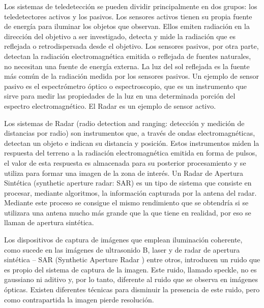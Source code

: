 Los sistemas de teledetección se pueden dividir principalmente en dos grupos: los teledetectores activos y los pasivos. Los sensores activos tienen su propia fuente de energía para iluminar los objetos que observan. Ellos emiten radiación en la dirección del objetivo a ser investigado, detecta y mide la radiación que es reflejada o retrodispersada desde el objetivo. Los sensores pasivos, por otra parte, detectan la radiación electromagnética emitida o reflejada de fuentes naturales, no necesitan una fuente de energía externa. La luz del sol reflejada es la fuente más común de la radiación medida por los sensores pasivos. Un ejemplo de sensor pasivo es el espectrómetro óptico o espectroscopio, que es un instrumento que sirve para medir las propiedades de la luz en una determinada porción del espectro electromagnético. El Radar es un ejemplo de sensor activo.


Los sistemas de Radar (radio detection and ranging: detección y medición de distancias por radio) son instrumentos que, a través de ondas electromagnéticas, detectan un objeto e indican su distancia y posición. Estos instrumentos miden la respuesta del terreno a la radiación electromagnética emitida en forma de pulsos, el valor de esta respuesta es almacenada para su posterior procesamiento y se utiliza para formar una imagen de la zona de interés. Un Radar de Apertura Sintética (synthetic aperture radar: SAR) es un tipo de sistema que consiste en procesar, mediante algoritmos, la información capturada por la antena del radar. Mediante este proceso se consigue el mismo rendimiento que se obtendría si se utilizara una antena mucho más grande que la que tiene en realidad, por eso se llaman de apertura sintética. 

Los dispositivos de captura de imágenes que emplean iluminación coherente, como sucede en las imágenes de ultrasonido B, laser y de radar de apertura sintética – SAR (Synthetic Aperture Radar ) entre otros, introducen un ruido que es propio del sistema de captura de la imagen. Este ruido, llamado speckle, no es gaussiano ni aditivo y, por lo tanto, diferente al ruido que se observa en imágenes ópticas. Existen diferentes técnicas para disminuir la presencia de este ruido, pero como contrapartida la imagen pierde resolución.

